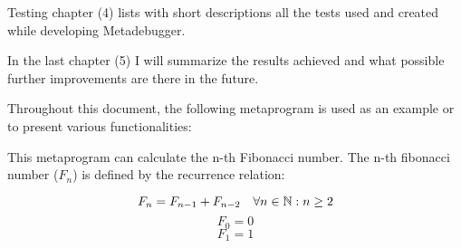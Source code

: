 Testing chapter (4) lists with short descriptions all the tests used and
created while developing Metadebugger.

In the last chapter (5) I will summarize the results achieved and what possible
further improvements are there in the future.


Throughout this document, the following metaprogram is used as an example or to
present various functionalities:


This metaprogram can calculate the n-th Fibonacci number. The n-th fibonacci
number (\(F_n\)) is defined by the recurrence relation:

\[
    F_n = F_{n-1} + F_{n-2} \quad \forall n \in \mathbb{N}: n \geq 2 \\
\]
\[
    F_0 = 0
\]
\[
    F_1 = 1
\]
